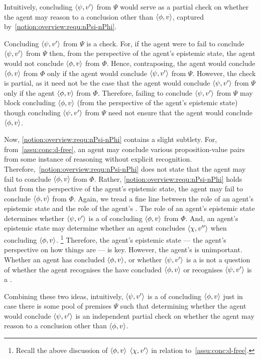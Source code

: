 \begin{note}
  Intuitively, concluding \(\langle \psi, v' \rangle\) from \(\Psi\) would serve as a partial check on whether the agent may reason to a conclusion other than \(\langle \phi, v \rangle\), captured by~\ref{notion:overview:requ:nPsi-nPhi}.

  Concluding \(\langle \psi, v' \rangle\) from \(\Psi\) is a check.
  For, if the agent were to fail to conclude \(\langle \psi, v' \rangle\) from \(\Psi\) then, from the perspective of the agent's epistemic state, the agent would not conclude \(\langle \phi, v \rangle\) from \(\Phi\).
  Hence, contraposing, the agent would conclude \(\langle \phi, v \rangle\) from \(\Phi\) only if the agent would conclude \(\langle \psi, v' \rangle\) from \(\Psi\).
  However, the check is partial, as it need not be the case that the agent would conclude \(\langle \psi, v' \rangle\) from \(\Psi\) only if the agent \(\langle \phi, v \rangle\) from \(\Phi\).
  Therefore, failing to conclude \(\langle \psi, v' \rangle\) from \(\Psi\) may block concluding \(\langle \phi, v \rangle\) (from the perspective of the agent's epistemic state) though concluding \(\langle \psi, v' \rangle\) from \(\Psi\) need not ensure that the agent would conclude \(\langle \phi, v \rangle\).

  Now, \ref{notion:overview:requ:nPsi-nPhi} contains a slight subtlety.
  For, from~\autoref{assu:conc:d-free}, an agent may conclude various proposition-value pairs from some instance of reasoning without explicit recognition.
  Therefore,~\ref{notion:overview:requ:nPsi-nPhi} does not state that the agent may fail to conclude \(\langle \phi, v \rangle\) from \(\Phi\).
  Rather, \ref{notion:overview:requ:nPsi-nPhi} holds that from the perspective of the agent's epistemic state, the agent may fail to conclude \(\langle \phi, v \rangle\) from \(\Phi\).
  Again, we tread a fine line between the role of an agent's epistemic state and the role of the agent's \stance{}.
  The role of an agent's epistemic state determines whether \(\langle \psi, v' \rangle\) is a \requ{} of concluding \(\langle \phi, v \rangle\) from \(\Phi\).
  And, an agent's epistemic state may determine whether an agent concludes \(\langle \chi, v'' \rangle\) when concluding \(\langle \phi, v \rangle\).%
  \footnote{
    Recall the above discussion of \(\langle \phi, v \rangle\) \indicatePr{} \(\langle \chi, v' \rangle\) in relation to~\autoref{assu:conc:d-free}.
  }
  Therefore, the agent's epistemic state --- the agent's perspective on how things are --- is key.
  However, the agent's \stance{} is unimportant.
  Whether an agent has concluded \(\langle \phi, v \rangle\), or whether \(\langle \psi, v' \rangle\) is a \requ{} is not a question of whether the agent recognises the have concluded \(\langle \phi, v \rangle\) or recognises \(\langle \psi, v' \rangle\) is a \requ{}.

  Combining these two ideas, intuitively, \(\langle \psi, v' \rangle\) is a \requ{} of concluding \(\langle \phi, v \rangle\) just in case there is some pool of premises \(\Psi\) such that determining whether the agent would conclude \(\langle \psi, v' \rangle\) is an independent partial check on whether the agent may reason to a conclusion other than \(\langle \phi, v \rangle\).
\end{note}

